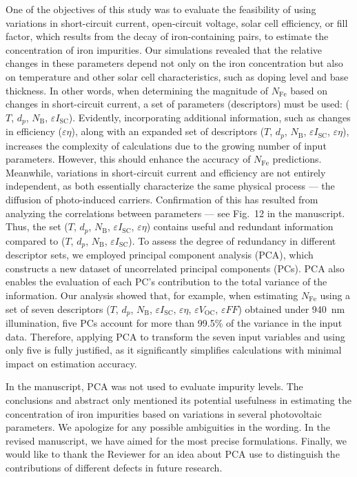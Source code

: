 \documentclass[a4paper,fleqn]{cas-sc}
\begin{document}
One of the objectives of this study was to evaluate the feasibility of using variations
in short-circuit current, open-circuit voltage, solar cell efficiency, or fill factor,
which results from the decay of iron-containing pairs, to estimate the concentration of iron impurities.
Our simulations revealed that the relative changes in these parameters depend
not only on the iron concentration but also on temperature and
other solar cell characteristics, such as doping level and base thickness.
In other words, when determining the magnitude of $N_\mathrm{Fe}$ based on changes in short-circuit current,
a set of parameters (descriptors) must be used: ($T$, $d_p$, $N_\mathrm{B}$, $\varepsilon I_\mathrm{SC}$).
Evidently, incorporating additional information, such as changes in efficiency ($\varepsilon \eta$), along with an expanded
set of descriptors ($T$, $d_p$, $N_\mathrm{B}$, $\varepsilon I_\mathrm{SC}$, $\varepsilon \eta$),
increases the complexity of calculations due to the growing number of input parameters.
However, this should enhance the accuracy of $N_\mathrm{Fe}$ predictions.
Meanwhile, variations in short-circuit current and efficiency are not entirely independent,
as both essentially characterize the same physical process --- the diffusion of photo-induced carriers.
Confirmation of this has resulted from analyzing the correlations between parameters --- see Fig.~12 in the manuscript.
Thus, the set ($T$, $d_p$, $N_\mathrm{B}$, $\varepsilon I_\mathrm{SC}$, $\varepsilon \eta$)
contains useful and redundant information compared to ($T$, $d_p$, $N_\mathrm{B}$, $\varepsilon I_\mathrm{SC}$).
To assess the degree of redundancy in different descriptor sets, we employed principal component analysis (PCA),
which constructs a new dataset of uncorrelated principal components (PCs).
PCA also enables the evaluation of each PC’s contribution to the total variance of the information.
Our analysis showed that, for example, when estimating $N_\mathrm{Fe}$ using a set of
seven descriptors ($T$, $d_p$, $N_\mathrm{B}$, $\varepsilon I_\mathrm{SC}$, $\varepsilon \eta$, $\varepsilon V_\mathrm{OC}$, $\varepsilon F\!F$)
obtained under 940~nm illumination, five PCs account for more than 99.5\% of the variance in the input data.
Therefore, applying PCA to transform the seven input variables and using only five is fully justified,
as it significantly simplifies calculations with minimal impact on estimation accuracy.

In the manuscript, PCA was not used to evaluate impurity levels.
The conclusions and abstract only mentioned its potential usefulness in estimating the concentration of iron impurities
based on variations in several photovoltaic parameters.
We apologize for any possible ambiguities in the wording.
In the revised manuscript, we have aimed for the most precise formulations.
Finally, we would like to thank the Reviewer for an idea about PCA use to distinguish the contributions of different defects in future research.
\end{document}
